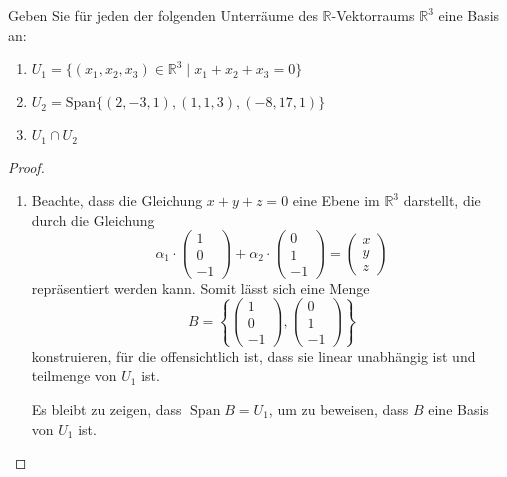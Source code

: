 \documentclass{../problemset}
\begin{document}
\begin{problem}
Geben Sie für jeden der folgenden Unterräume des $\mathbb{R}$-Vektorraums $\mathbb{R}^3$ eine Basis an:
\begin{enumerate}
	\item $U_1 = \{(x_1, x_2, x_3) \in \mathbb{R}^3 \mid x_1 + x_2 + x_3 = 0\}$
	\item $U_2 = \text{Span}\{(2, -3, 1), (1, 1, 3), (-8, 17, 1)\}$
	\item $U_1 \cap U_2$
\end{enumerate}
\begin{proof}
	$ $

	\begin{enumerate}
		\item Beachte, dass die Gleichung $x + y + z = 0$ eine Ebene im $\mathbb{R}^3$ darstellt, die durch die Gleichung
		      \[
			      \alpha_1 \cdot \begin{pmatrix}
				      1 \\
				      0 \\
				      -1
			      \end{pmatrix} + \alpha_2 \cdot \begin{pmatrix}
				      0 \\
				      1 \\
				      -1
			      \end{pmatrix} = \begin{pmatrix}
				      x \\
				      y \\
				      z
			      \end{pmatrix}
		      \]
		      repräsentiert werden kann. Somit lässt sich eine Menge
		      \[
			      B = \left\{\begin{pmatrix}
				      1 \\
				      0 \\
				      -1
			      \end{pmatrix}, \begin{pmatrix}
				      0 \\
				      1 \\
				      -1
			      \end{pmatrix}\right\}
		      \]
		      konstruieren, für die offensichtlich ist, dass sie linear unabhängig ist und teilmenge von $U_1$ ist.

		      Es bleibt zu zeigen, dass $\operatorname{Span} B = U_1$, um zu beweisen, dass $B$ eine Basis von $U_1$ ist.


\end{enumerate}
\end{proof}
\end{problem}
\end{document}
